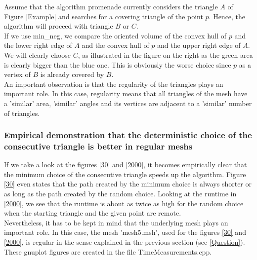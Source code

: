 \documentclass[10pt]{article}
\begin{document}
	Assume that the algorithm {\ttfamily promenade} currently considers  the triangle $ A $ of Figure \ref{Example} and searches for a covering triangle of the point $ p $.
	Hence, the algorithm will proceed with triangle $ B $ or $ C $. \\
	 If we use {\ttfamily min\_neg}, we compare the oriented volume of the convex hull of $ p $ and the lower right edge of $ A $ and the convex hull of $p$ and the upper right edge of $ A $. We will clearly choose $ C $, as illustrated in the figure on the right as the green area is clearly bigger than the blue one. This is obviously the worse choice since $p$ as a vertex of $B$ is already covered by $ B $.  \\
	 An important observation is that the regularity of the triangles plays an important role. In this case, regularity means that all triangles of the mesh have a 'similar' area, 'similar' angles and its vertices are adjacent to a 'similar' number of triangles.



\subsubsection{Empirical demonstration that the deterministic choice of the consecutive triangle is better in regular meshs}
If we take a look at the figures \ref{30} and \ref{2000}, it becomes empirically clear that the minimum choice of the consecutive triangle speeds up the algorithm. Figure \ref{30} even states that the path created by the minimum choice is always shorter or as long as the path created by the random choice. Looking at the runtime in \ref{2000}, we see that the runtime is about as twice as high for the random choice when the starting triangle and the given point are remote. 
 \\
Nevertheless, it has to be kept in mind that the underlying mesh plays an important role.
In this case, the mesh 'mesh5.msh', used for the figures \ref{30} and \ref{2000}, is regular in the sense explained in the previous section (see \ref{Question}). These {\ttfamily gnuplot} figures are created in the file TimeMeasurements.cpp.
\end{document}
